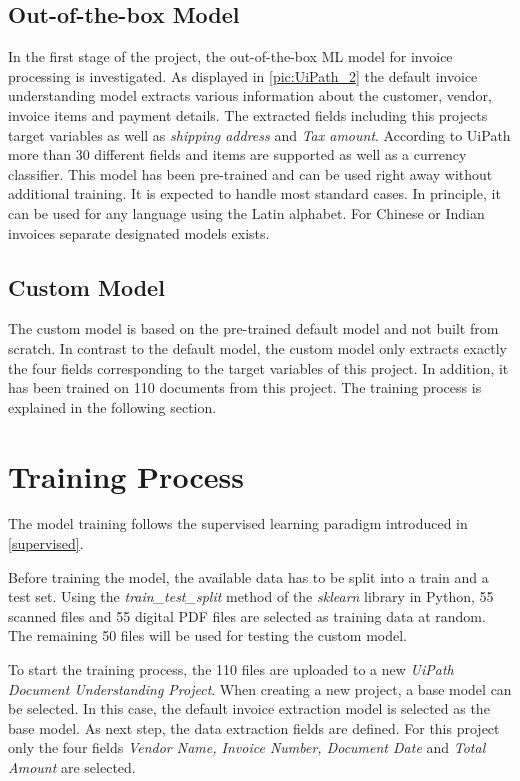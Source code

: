 \subsection*{Out-of-the-box Model}
In the first stage of the project, the out-of-the-box \acf{ML} model for invoice processing is investigated. As displayed in \cref{pic:UiPath_2} the default invoice understanding model extracts various information about the customer, vendor, invoice items and payment details. The extracted fields including this projects target variables as well as \textit{shipping address} and \textit{Tax amount}. According to UiPath \cite{uipathdoc} more than 30 different fields and items are supported as well as a currency classifier. This model has been pre-trained and can be used right away without additional training. It is expected to handle most standard cases. In principle, it can be used for any language using the Latin alphabet. For Chinese or Indian invoices separate designated models exists.
\subsection*{Custom Model}
The custom model is based on the pre-trained default model and not built from scratch. In contrast to the default model, the custom model only extracts exactly the four fields corresponding to the target variables of this project. In addition, it has been trained on 110 documents from this project. The training process is explained in the following section.

\newpage
\section{Training Process}

The model training follows the supervised learning paradigm introduced in \cref{supervised}.

Before training the model, the available data has to be split into a train and a test set. Using the \textit{train\_test\_split} method of the \textit{sklearn} library in Python, 55 scanned files and 55 digital PDF files are selected as training data at random. The remaining 50 files will be used for testing the custom model.

To start the training process, the 110 files are uploaded to a new \textit{UiPath Document Understanding Project}. When creating a new project, a base model can be selected. In this case, the default invoice extraction model is selected as the base model. As next step, the data extraction fields are defined. For this project only the four fields \textit{Vendor Name, Invoice Number, Document Date} and \textit{Total Amount} are selected.

